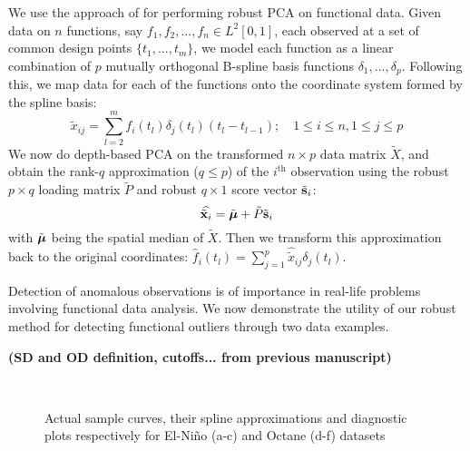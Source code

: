 \documentclass[12pt,letterpaper]{article}
\theoremstyle{definition} \newtheorem{Definition}[Theorem]{Definition}
\begin{document}
We use the approach of \cite{BoenteBarrera15} for performing robust PCA on functional data. Given data on $n$ functions, say $f_1, f_2, ..., f_n \in L^2[0,1]$, each observed at a set of common design points $\{ t_1, ..., t_m \} $, we model each function as a linear combination of $p$ mutually orthogonal B-spline basis functions $\delta_1, ..., \delta_p$. Following this, we map data for each of the functions onto the coordinate system formed by the spline basis:
%
\begin{equation}
\tilde x_{ij} = \sum_{l=2}^m f_i(t_l) \delta_j(t_l) (t_l - t_{l-1}); \quad 1 \leq i \leq n, 1 \leq j \leq p
\end{equation}
%
We now do depth-based PCA on the transformed $n \times p$ data matrix $\tilde X$, and obtain the rank-$q$ approximation ($q \leq p$) of the $i^\text{th}$ observation using the robust $p \times q$ loading matrix $\tilde P$ and robust $q \times 1$ score vector $\tilde{{\bf{s}}}_i$:
%
$$ \widehat{\tilde{{\bf{x}}}_i} = \tilde{{\boldsymbol{\mu}}} + \tilde P \tilde {{\bf{s}}}_i $$
%
with $\tilde{{\boldsymbol{\mu}}}$ being the spatial median of $\tilde X$. Then we transform this approximation back to the original coordinates: $\hat f_i (t_l) = \sum_{j=1}^p \widehat{ \tilde x}_{ij} \delta_j (t_l)$.

Detection of anomalous observations is of importance in real-life problems involving functional data analysis. We now demonstrate the utility of our robust method for detecting functional outliers through two data examples. 

\textbf{(SD and OD definition, cutoffs... from previous manuscript)
}

\begin{figure}[t]
\begin{center}
\\
\vspace{-1em}
\caption{Actual sample curves, their spline approximations and diagnostic plots respectively for El-Ni\~no (a-c) and Octane (d-f) datasets}
\label{fig:fPCAfig}
\end{center}
\end{figure}
\end{document}

